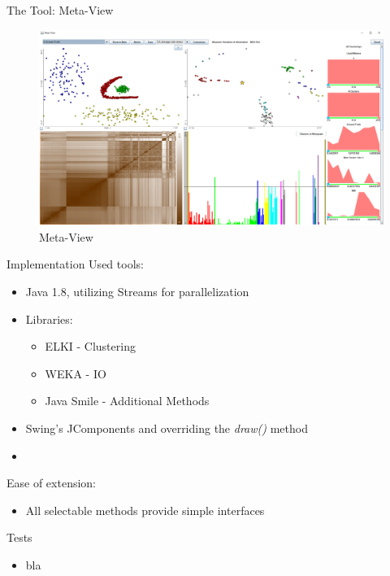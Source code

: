 \documentclass[aspectratio=169]{beamer}
\begin{document}
\begin{frame}{The Tool: Meta-View}
	
	\begin{figure}
	  \centering
	    \includegraphics[width=.9\textwidth]{meta-view}
	  \caption{Meta-View}
	  \label{fig:meta-view}
	\end{figure}

\end{frame}


\begin{frame}{Implementation}
Used tools:
	\begin{itemize}
		\item Java 1.8, utilizing Streams for parallelization
		\item Libraries:
		\begin{itemize}
			\item  ELKI \cite{10.1007/978-3-540-69497-7_41} - Clustering
			\item WEKA \cite{10.1145/1656274.1656278} - IO
			\item Java Smile \cite{javasmile} - Additional Methods
		\end{itemize}
		\item Swing's JComponents and overriding the \emph{draw()} method
		\item[]
	\end{itemize}
Ease of extension:
	\begin{itemize}
		\item All selectable methods provide simple interfaces
	\end{itemize}
\end{frame}


\begin{frame}{Tests}
	
	\begin{itemize}
		\item bla
	\end{itemize}

\end{frame}
\end{document}

